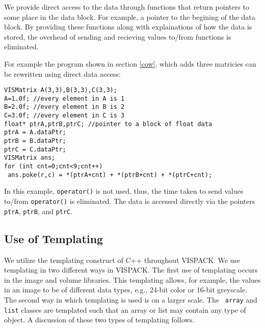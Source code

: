 We provide direct access to the data through functions
that return pointers to some place in the data block.
For example, a pointer to the begining of the data block.
By providing these functions along with explainations of how
the data is stored, the overhead of sending and recieving values
to/from functions is eliminated.  

For example the program shown in section \ref{cow}, which
adds three matricies can be rewritten using direct data access:
\begin{list}{}{\setlength{\partopsep}{-1in}
\setlength{\topsep}{0in} \setlength{\labelwidth}{1in}
\setlength{\leftmargin}{0.5in} \setlength{\labelsep}{0.2in}}
 \item {\tt VISMatrix A(3,3),B(3,3),C(3,3);}\\
{\tt A=1.0f; //every element in A is 1}\\
{\tt B=2.0f; //every element in B is 2}\\
{\tt C=3.0f; //every element in C is 3}\\
{\tt float* ptrA,ptrB,ptrC; //pointer to a block of float data}\\
{\tt ptrA = A.dataPtr;}\\
{\tt ptrB = B.dataPtr;}\\
{\tt ptrC = C.dataPtr;}\\
{\tt VISMatrix ans;}\\
{\tt for (int cnt=0;cnt<9;cnt++)}\\
{\tt \hspace*{0.5in} ans.poke(r,c) = *(ptrA+cnt) + *(ptrB+cnt) + *(ptrC+cnt);}
\end{list}
In this example, {\tt operator()} is not used, thus, the time taken to
send values to/from {\tt operator()} is eliminated.  The data is accessed
directly via the pointers {\tt ptrA}, {\tt ptrB}, and {\tt ptrC}.

\subsection{Use of Templating}
We utilize the templating construct of C++ throughout VISPACK.
We use templating in two different ways in VISPACK.  
The first use of templating occurs in the image and volume libraries.  
This templating allows, for example, the values in an image to be of 
different data types, e.g., 24-bit color or 16-bit greyscale.  The 
second way in which templating is used is on a larger scale.  The {\tt 
array} and {\tt list} classes are templated such that an array or list 
may contain any type of object.  A discussion of these two types of 
templating follows.

